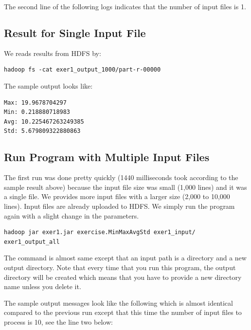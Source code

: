 The second line of the following logs indicates that the number of
input files is 1.

\subsection{Result for Single Input File}

We reads results from HDFS by:

\begin{lstlisting}
hadoop fs -cat exer1_output_1000/part-r-00000
\end{lstlisting}

The sample output looks like:

\begin{lstlisting}
Max: 19.9678704297
Min: 0.218880718983
Avg: 10.225467263249385
Std: 5.679809322880863
\end{lstlisting}

\subsection{Run Program with Multiple Input Files}

The first run was done pretty quickly (1440 milliseconds took
according to the sample result above) because the input file size was
small (1,000 lines) and it was a single file. We provides more input
files with a larger size (2,000 to 10,000 lines). Input files are
already uploaded to HDFS. We simply run the program again with a
slight change in the parameters.

\begin{lstlisting}
hadoop jar exer1.jar exercise.MinMaxAvgStd exer1_input/ exer1_output_all
\end{lstlisting}

The command is almost same except that an input path is a directory
and a new output directory. Note that every time that you run this
program, the output directory will be created which means that you
have to provide a new directory name unless you delete it.

The sample output messages look like the following which is almost
identical compared to the previous run except that this time the
number of input files to process is 10, see the line two below:

